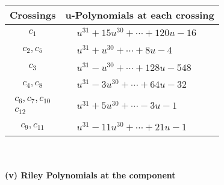 \documentclass[1p]{elsarticle_modified}
\theoremstyle{definition}
\begin{document}
\begin{tabular}{m{50pt}|m{274pt}}
Crossings & \hspace{64pt}u-Polynomials at each crossing \\
\hline $$\begin{aligned}c_{1}\end{aligned}$$&$\begin{aligned}
&u^{31}+15 u^{30}+\cdots+120 u-16
\end{aligned}$\\
\hline $$\begin{aligned}c_{2},c_{5}\end{aligned}$$&$\begin{aligned}
&u^{31}+u^{30}+\cdots+8 u-4
\end{aligned}$\\
\hline $$\begin{aligned}c_{3}\end{aligned}$$&$\begin{aligned}
&u^{31}- u^{30}+\cdots+128 u-548
\end{aligned}$\\
\hline $$\begin{aligned}c_{4},c_{8}\end{aligned}$$&$\begin{aligned}
&u^{31}-3 u^{30}+\cdots+64 u-32
\end{aligned}$\\
\hline $$\begin{aligned}c_{6},c_{7},c_{10}\\c_{12}\end{aligned}$$&$\begin{aligned}
&u^{31}+5 u^{30}+\cdots-3 u-1
\end{aligned}$\\
\hline $$\begin{aligned}c_{9},c_{11}\end{aligned}$$&$\begin{aligned}
&u^{31}-11 u^{30}+\cdots+21 u-1
\end{aligned}$\\
\hline
\end{tabular}\\~\\
\newpage\renewcommand{\arraystretch}{1}
\flushleft \textbf{(v) Riley Polynomials at the component}\newline \\
\end{document}
